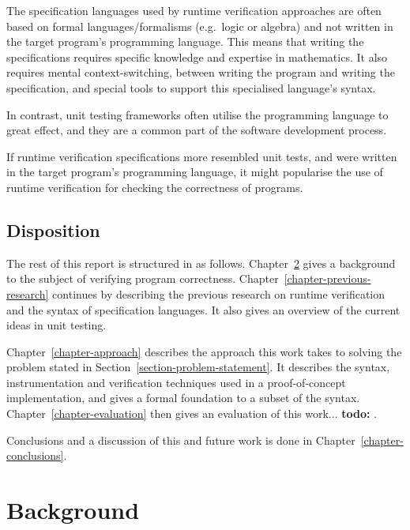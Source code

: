 \documentclass[a4paper,11pt]{kth-mag}
\newcommand{\todo}[1]{\textbf{todo: #1}}
\begin{document}
The specification languages used by runtime verification approaches are often
based on formal languages/formalisms (e.g.\ logic or algebra) and not written
in the target program's programming language. This means that writing the
specifications requires specific knowledge and expertise in mathematics. It
also requires mental context-switching, between writing the program and writing
the specification, and special tools to support this specialised language's
syntax.

In contrast, unit testing frameworks often utilise the programming language to
great effect, and they are a common part of the software development process.

If runtime verification specifications more resembled unit tests, and were
written in the target program's programming language, it might popularise the
use of runtime verification for checking the correctness of programs.


\section{Disposition}

The rest of this report is structured in as follows.
Chapter~\ref{chapter-background} gives a
background to the subject of verifying program correctness.
Chapter~\ref{chapter-previous-research} continues
by describing the previous research on runtime verification and the syntax of
specification languages. It also gives an overview of the current ideas in unit
testing.

Chapter~\ref{chapter-approach} describes the approach this work takes to
solving the problem stated in Section~\ref{section-problem-statement}. It
describes the syntax, instrumentation and verification techniques used in a
proof-of-concept implementation, and gives a formal foundation to a subset of
the syntax. Chapter~\ref{chapter-evaluation} then gives an evaluation of this
work...
\todo{}.

Conclusions and a discussion of this and future work is done in
Chapter~\ref{chapter-conclusions}.






\pagestyle{newchap}
\chapter{Background} \label{chapter-background}
\end{document}
